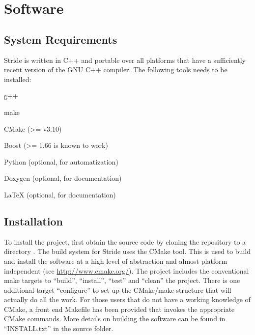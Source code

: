 \chapter{Software}
\label{chap:software}


\section{System Requirements}
\label{section:system}

Stride is written in C++ and portable over all platforms that have a sufficiently recent version of the GNU C++ compiler.
The following tools needs to be installed:
\begin{compactitem}
    \item g++
    \item make
    \item CMake (\textgreater = v3.10)
    \item Boost (\textgreater = 1.66 is known to work)
    \item Python (optional, for automatization)
    \item Doxygen (optional, for documentation)
    \item LaTeX (optional, for documentation)
\end{compactitem}


\section{Installation}
\label{section:Installation}

To install the project, first obtain the source code by cloning the repository to a directory .
The build system for Stride uses the CMake tool. This is used to build and install the software at a high level of abstraction and almost platform independent (see \url{http://www.cmake.org/}).
The project includes the conventional make targets to ``build'', ``install'', ``test'' and ``clean'' the project. There is one additional target ``configure'' to set up the CMake/make structure that will actually do all the work.
For those users that do not have a working knowledge of CMake, a front end Makefile has been provided that invokes the appropriate CMake commands.
More details on building the software can be found in ``INSTALL.txt'' in the source folder.


